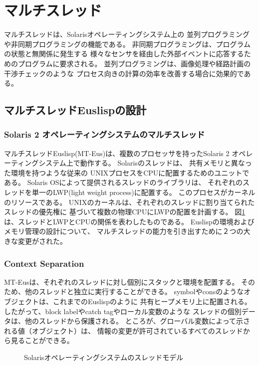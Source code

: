 \newpage
\section{マルチスレッド\label{mthread}}

マルチスレッドは、Solarisオペレーティングシステム上の
並列プログラミングや非同期プログラミングの機能である。
非同期プログラミングは、プログラムの状態と無関係に発生する
様々なセンサを経由した外部イベントに応答するためのプログラムに要求される。
並列プログラミングは、画像処理や経路計画の干渉チェックのような
プロセス向きの計算の効率を改善する場合に効果的である。

\subsection{マルチスレッドEuslispの設計}
\subsubsection{ Solaris 2 オペレーティングシステムのマルチスレッド}
マルチスレッドEuslisp(MT-Eus)は、複数のプロセッサを持ったSolaris 2 
オペレーティングシステム上で動作する。
Solarisのスレッドは、 共有メモリと異なった環境を持つような従来の
UNIXプロセスをCPUに配置するためのユニットである。%
Solaris OSによって提供されるスレッドのライブラリは、
それぞれのスレッドを単一のLWP(light weight process)に配置する。
このプロセスがカーネルのリソースである。
UNIXのカーネルは、それぞれのスレッドに割り当てられたスレッドの優先権に
基づいて複数の物理CPUにLWPの配置を計画する。
図\ref{threadmodel}は、スレッドとLWPとCPUの関係を表わしたものである。
Euslispの環境およびメモリ管理の設計について、
マルチスレッドの能力を引き出すために２つの大きな変更がされた。

\subsubsection{Context Separation}
MT-Eusは、それぞれのスレッドに対し個別にスタックと環境を配置する。
そのため、他のスレッドと独立に実行することができる。
symbolやconsのようなオブジェクトは、これまでのEuslispのように
共有ヒープメモリ上に配置される。
したがって、block labelやcatch tagやローカル変数のような
スレッドの個別データは、他のスレッドから保護される。
ところが、グローバル変数によって示される値（オブジェクト）は、
情報の変更が許可されているすべてのスレッドから見ることができる。

\begin{figure}[b]
\begin{center}
\caption{Solarisオペレーティングシステムのスレッドモデル}\label{threadmodel}
\end{center}
\end{figure}

